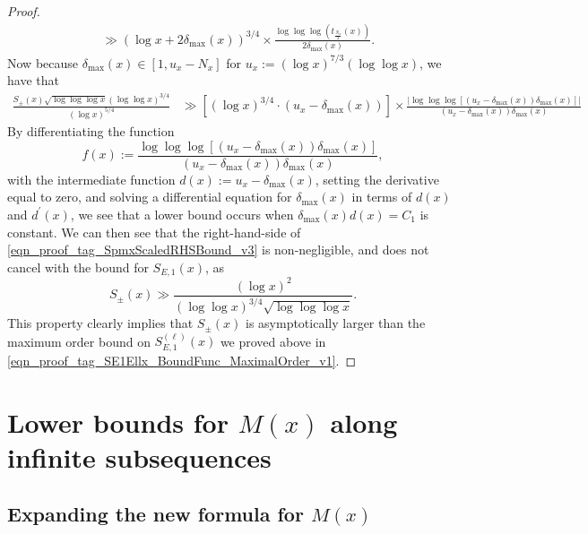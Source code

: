 \documentclass[11pt,reqno,a4letter]{article}
\numberwithin{figure}{section}
\numberwithin{table}{section}
\theoremstyle{plain}
\numberwithin{theorem}{section}
\theoremstyle{definition}
\begin{document}
\begin{proof}
\begin{align*}
     & \gg (\log x + 2 \delta_{\max}(x))^{3/4} \times \frac{\log\log\log(t_{\frac{N_x}{2}}(x))}{2 \delta_{\max}(x)}. 
\end{align*} 
Now because $\delta_{\max}(x) \in [1, u_x - N_x]$ for $u_x := (\log x)^{7/3} (\log\log x)$, 
we have that 
\begin{align} 
\label{eqn_proof_tag_SpmxScaledRHSBound_v3} 
\frac{S_{\pm}(x) \sqrt{\log\log\log x} (\log\log x)^{3/4}}{(\log x)^{5/4}} & \gg 
     \left[(\log x)^{3/4} \cdot (u_x - \delta_{\max}(x))\right] \times 
     \frac{\left\lvert \log\log\log\left[(u_x - \delta_{\max}(x)) 
     \delta_{\max}(x)\right] \right\rvert}{(u_x - \delta_{\max}(x)) \delta_{\max}(x)} 
\end{align} 
By differentiating the function 
\[
f(x) := \frac{\log\log\log\left[(u_x - \delta_{\max}(x)) 
        \delta_{\max}(x)\right]}{(u_x - \delta_{\max}(x)) \delta_{\max}(x)}, 
\] 
with the intermediate function $d(x) := u_x - \delta_{\max}(x)$, 
setting the derivative equal to zero, and 
solving a differential equation for $\delta_{\max}(x)$ in terms of 
$d(x)$ and $d^{\prime}(x)$, we see that a lower bound occurs 
when $\delta_{\max}(x) d(x) = C_1$ is constant. 
We can then see that the 
right-hand-side of \eqref{eqn_proof_tag_SpmxScaledRHSBound_v3} 
is non-negligible, and does not cancel with the bound for $S_{E,1}(x)$, as 
\[
S_{\pm}(x) \gg \frac{(\log x)^{2}}{(\log\log x)^{3/4} \sqrt{\log\log\log x}}. 
\]
This property clearly implies that $S_{\pm}(x)$ is asymptotically larger than the 
maximum order bound on $S_{E,1}^{(\ell)}(x)$ we proved above in 
\eqref{eqn_proof_tag_SE1Ellx_BoundFunc_MaximalOrder_v1}. 
\end{proof} 

\newpage 
\section{Lower bounds for $M(x)$ along infinite subsequences} 
\label{Section_KeyApplications} 

\subsection{Expanding the new formula for $M(x)$} 
\end{document}
